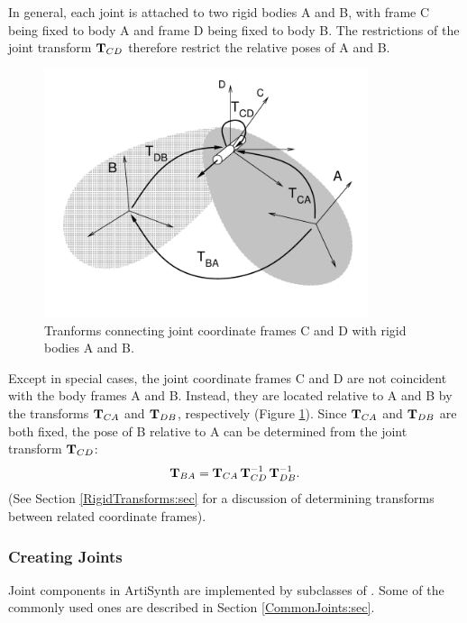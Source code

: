 In general, each joint is attached to two rigid bodies A and B, with
frame C being fixed to body A and frame D being fixed to body B. The
restrictions of the joint transform ${\bf T}_{CD}$ therefore restrict the
relative poses of A and B.

\begin{figure}[h]
\begin{center}
 \includegraphics[width=3.74in]{images/jointBodyFrames}
\end{center}
\caption{Tranforms connecting joint coordinate frames C and D with
rigid bodies A and B.}
\label{jointBodyFrames:fig}
\end{figure}

Except in special cases, the joint coordinate frames C and D are not
coincident with the body frames A and B.  Instead, they are located
relative to A and B by the transforms ${\bf T}_{CA}$ and ${\bf T}_{DB}$,
respectively (Figure \ref{jointBodyFrames:fig}). 
Since ${\bf T}_{CA}$ and ${\bf T}_{DB}$ are both fixed, the pose
of B relative to A can be determined from
the joint transform ${\bf T}_{CD}$:
%
\begin{equation}
{\bf T}_{BA} = {\bf T}_{CA} \, {\bf T}_{CD}^{-1} \, {\bf T}_{DB}^{-1}.
\label{jointPose:eqn}
\end{equation}
%
(See Section \ref{RigidTransforms:sec} for a discussion of determining
transforms between related coordinate frames).

\subsubsection{Creating Joints}
\label{CreatingJoints:sec}

Joint components in ArtiSynth are implemented by subclasses of
.  Some of
the commonly used ones are described in Section
\ref{CommonJoints:sec}.

